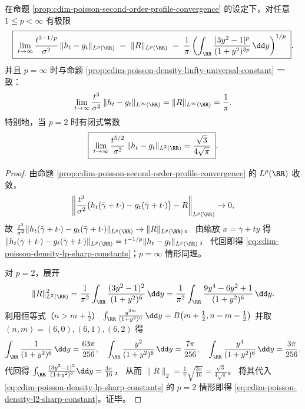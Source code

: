 \begin{corollary}\label{cor:cdim-poisson-density-lp-sharp-constants}
在命题 \ref{prop:cdim-poisson-second-order-profile-convergence} 的设定下，对任意 \(1\le p<\infty\) 有极限
\begin{equation}\label{eq:cdim-poisson-density-lp-sharp-constants}
\boxed{\;
\lim_{t\to\infty}\frac{t^{3-1/p}}{\sigma^2}\,\|h_t-g_t\|_{L^p(\RR)}
\;=\;
\|R\|_{L^p(\RR)}
\;=\;
\frac{1}{\pi}\left(\int_{\RR}\frac{|3y^2-1|^p}{(1+y^2)^{3p}}\,\dd y\right)^{1/p}\; }.
\end{equation}
并且 \(p=\infty\) 时与命题 \ref{prop:cdim-poisson-density-linfty-universal-constant} 一致：
\[
\lim_{t\to\infty}\frac{t^3}{\sigma^2}\,\|h_t-g_t\|_{L^\infty(\RR)}=\|R\|_{L^\infty(\RR)}=\frac{1}{\pi}.
\]
特别地，当 \(p=2\) 时有闭式常数
\begin{equation}\label{eq:cdim-poisson-density-l2-sharp-constant}
\boxed{\;
\lim_{t\to\infty}\frac{t^{5/2}}{\sigma^2}\,\|h_t-g_t\|_{L^2(\RR)}
=\frac{\sqrt3}{4\sqrt\pi}\; }.
\end{equation}
\end{corollary}
\begin{proof}
由命题 \ref{prop:cdim-poisson-second-order-profile-convergence} 的 \(L^p(\RR)\) 收敛，
\[
\left\|\frac{t^3}{\sigma^2}\bigl(h_t(\bar\gamma+t\cdot)-g_t(\bar\gamma+t\cdot)\bigr)-R\right\|_{L^p(\RR)}\to 0,
\]
故
\(
\frac{t^3}{\sigma^2}\|h_t(\bar\gamma+t\cdot)-g_t(\bar\gamma+t\cdot)\|_{L^p(\RR)}\to \|R\|_{L^p(\RR)}
\)。
由缩放 \(x=\bar\gamma+ty\) 得
\(
\|h_t(\bar\gamma+t\cdot)-g_t(\bar\gamma+t\cdot)\|_{L^p(\RR)}=t^{-1/p}\|h_t-g_t\|_{L^p(\RR)}
\)，
代回即得 \eqref{eq:cdim-poisson-density-lp-sharp-constants}；\(p=\infty\) 情形同理。
\par
对 \(p=2\)，展开
\[
\|R\|_{L^2(\RR)}^2=\frac{1}{\pi^2}\int_{\RR}\frac{(3y^2-1)^2}{(1+y^2)^6}\,\dd y
=\frac{1}{\pi^2}\int_{\RR}\frac{9y^4-6y^2+1}{(1+y^2)^6}\,\dd y.
\]
利用恒等式（\(n>m+\tfrac12\)）
\(
\int_{\RR}\frac{y^{2m}}{(1+y^2)^{n}}\,\dd y=B\!\left(m+\tfrac12,n-m-\tfrac12\right)
\)
并取 \((n,m)=(6,0),(6,1),(6,2)\) 得
\[
\int_{\RR}\frac{1}{(1+y^2)^6}\,\dd y=\frac{63\pi}{256},\quad
\int_{\RR}\frac{y^2}{(1+y^2)^6}\,\dd y=\frac{7\pi}{256},\quad
\int_{\RR}\frac{y^4}{(1+y^2)^6}\,\dd y=\frac{3\pi}{256}.
\]
代回得
\(
\int_{\RR}\frac{(3y^2-1)^2}{(1+y^2)^6}\dd y=\frac{3\pi}{16}
\)，
从而 \(\|R\|_2=\frac{1}{\pi}\sqrt{\frac{3\pi}{16}}=\frac{\sqrt3}{4\sqrt\pi}\)。
将其代入 \eqref{eq:cdim-poisson-density-lp-sharp-constants} 的 \(p=2\) 情形即得 \eqref{eq:cdim-poisson-density-l2-sharp-constant}。证毕。
\end{proof}

